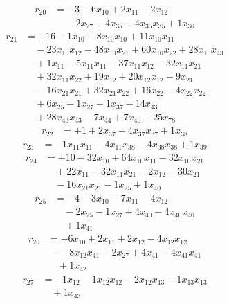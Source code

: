 \[\begin{aligned}
r_{20} &= - 3 - 6 x_{10} + 2 x_{11} - 2 x_{12} \\
 &\quad - 2 x_{27} - 4 x_{35} - 4 x_{35} x_{35} + 1 x_{36}
\end{aligned}\]
\[\begin{aligned}
r_{21} &= + 16 - 1 x_{10} - 8 x_{10} x_{10} + 11 x_{10} x_{11} \\
 &\quad - 23 x_{10} x_{12} - 48 x_{10} x_{21} + 60 x_{10} x_{22} + 28 x_{10} x_{43} \\
 &\quad + 1 x_{11} - 5 x_{11} x_{11} - 37 x_{11} x_{12} - 32 x_{11} x_{21} \\
 &\quad + 32 x_{11} x_{22} + 19 x_{12} + 20 x_{12} x_{12} - 9 x_{21} \\
 &\quad - 16 x_{21} x_{21} + 32 x_{21} x_{22} + 16 x_{22} - 4 x_{22} x_{22} \\
 &\quad + 6 x_{25} - 1 x_{27} + 1 x_{37} - 14 x_{43} \\
 &\quad + 28 x_{43} x_{43} - 7 x_{44} + 7 x_{45} - 25 x_{78}
\end{aligned}\]
\[\begin{aligned}
r_{22} &= + 1 + 2 x_{37} - 4 x_{37} x_{37} + 1 x_{38}
\end{aligned}\]
\[\begin{aligned}
r_{23} &= - 1 x_{11} x_{11} - 4 x_{11} x_{38} - 4 x_{38} x_{38} + 1 x_{39}
\end{aligned}\]
\[\begin{aligned}
r_{24} &= + 10 - 32 x_{10} + 64 x_{10} x_{11} - 32 x_{10} x_{21} \\
 &\quad + 22 x_{11} + 32 x_{11} x_{21} - 2 x_{12} - 30 x_{21} \\
 &\quad - 16 x_{21} x_{21} - 1 x_{25} + 1 x_{40}
\end{aligned}\]
\[\begin{aligned}
r_{25} &= - 4 - 3 x_{10} - 7 x_{11} - 4 x_{12} \\
 &\quad - 2 x_{25} - 1 x_{27} + 4 x_{40} - 4 x_{40} x_{40} \\
 &\quad + 1 x_{41}
\end{aligned}\]
\[\begin{aligned}
r_{26} &= - 6 x_{10} + 2 x_{11} + 2 x_{12} - 4 x_{12} x_{12} \\
 &\quad - 8 x_{12} x_{41} - 2 x_{27} + 4 x_{41} - 4 x_{41} x_{41} \\
 &\quad + 1 x_{42}
\end{aligned}\]
\[\begin{aligned}
r_{27} &= - 1 x_{12} - 1 x_{12} x_{12} - 2 x_{12} x_{13} - 1 x_{13} x_{13} \\
 &\quad + 1 x_{43}
\end{aligned}\]
